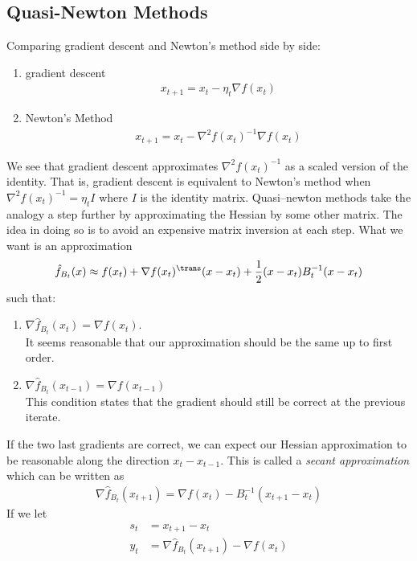 \subsection{Quasi-Newton Methods}
Comparing gradient descent and Newton's method side by side:
\begin{enumerate}
    \item gradient descent
    \begin{align*}
        x_{t+1} = x_t - \eta_t \nabla f(x_t)
    \end{align*}
    \item Newton's Method
    \begin{align*}
        x_{t+1} = x_t - \nabla^2 f(x_t)^{-1} \nabla f(x_t)
    \end{align*}
\end{enumerate}
We see that gradient descent approximates $\nabla^2 f(x_t)^{-1}$ as a scaled version of the identity. That is, gradient descent is equivalent to Newton's method when $\nabla^2 f(x_t)^{-1} = \eta_t I$ where $I$ is the identity matrix. Quasi--newton methods take the analogy a step further by approximating the Hessian by some other matrix. The idea in doing so is to avoid an expensive matrix inversion at each step. What we want is an approximation
\begin{align*}
    \hat{f}_{B_t}(x) \approx f(x_t) + \nabla f(x_t)^\trans (x - x_t) + \dfrac{1}{2} (x-x_t)B_t^{-1} (x-x_t)
\end{align*}
such that:
\begin{enumerate}
    \item $\nabla \hat{f}_{B_t} (x_t) = \nabla f(x_t)$.\\
    It seems reasonable that our approximation should be the same up to first order. 
    \item $\nabla \hat{f}_{B_t} (x_{t-1}) = \nabla f(x_{t-1})$\\
    This condition states that the gradient should still be correct at the previous iterate.
\end{enumerate}
 If the two last gradients are correct, we can expect our Hessian approximation to be reasonable along the direction $x_t - x_{t-1}$. This is called a \emph{secant approximation} which can be written as 
 \begin{align*}
     \nabla \hat{f}_{B_t} (x_{t+1}) = \nabla f(x_t) - B_t^{-1}(x_{t+1} - x_t)
 \end{align*}
 If we let
 \begin{align*}
     s_t &= x_{t+1} - x_t \\
     y_t &= \nabla \hat{f}_{B_t}(x_{t+1}) - \nabla f(x_t)
 \end{align*}
